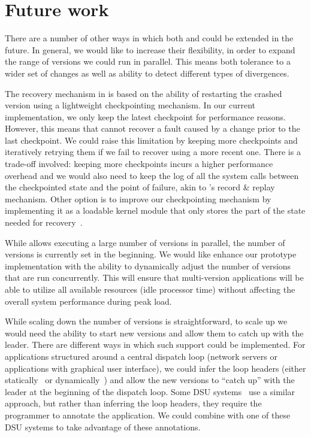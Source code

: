 \section{Future work}
\label{sec:future-work}

There are a number of other ways in which both \mx and \varan could be extended
in the future. In general, we would like to increase their flexibility, in
order to expand the range of versions we could run in parallel. This means both
tolerance to a wider set of changes as well as ability to detect different types
of divergences.

The recovery mechanism in \mx is based on the ability of restarting the crashed
version using a lightweight checkpointing mechanism. In our current
implementation, we only keep the latest checkpoint for performance reasons.
However, this means that \mx cannot recover a fault caused by a change prior to
the last checkpoint. We could raise this limitation by keeping more checkpoints
and iteratively retrying them if we fail to recover using a more recent one.
There is a trade-off involved: keeping more checkpoints incurs a higher
performance overhead and we would also need to keep the log of all the system
calls between the checkpointed state and the point of failure, akin to \varan's
record \& replay mechanism. Other option is to improve our checkpointing
mechanism by implementing it as a loadable kernel module that only stores the
part of the state needed for recovery~\cite{flashback}.


While \varan allows executing a large number of versions in parallel, the
number of versions is currently set in the beginning. We would like enhance our
prototype implementation with the ability to dynamically adjust the number of
versions that are run concurrently. This will ensure that multi-version
applications will be able to utilize all available resources (\ie idle
processor time) without affecting the overall system performance during peak
load.

While scaling down the number of versions is straightforward, to scale up we
would need the ability to start new versions and allow them to catch up with the
leader. There are different ways in which such support could be implemented. For
applications structured around a central dispatch loop (\eg network servers or
applications with graphical user interface), we could infer the loop headers
(either statically~\cite{DJgraphs,havlak} or dynamically~\cite{sato11}) and
allow the new versions to ``catch up'' with the leader at the beginning of the
dispatch loop. Some DSU systems~\cite{kitsune} use a similar approach, but
rather than inferring the loop headers, they require the programmer to annotate
the application. We could combine \varan with one of these DSU systems to take
advantage of these annotations.

